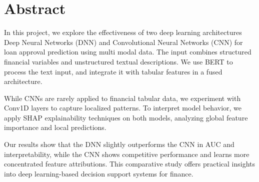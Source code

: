 \section*{Abstract}

In this project, we explore the effectiveness of two deep learning architectures Deep Neural Networks (DNN) and Convolutional Neural Networks (CNN) for loan approval prediction using multi modal data. The input combines structured financial variables and unstructured textual descriptions. We use BERT to process the text input, and integrate it with tabular features in a fused architecture.

While CNNs are rarely applied to financial tabular data, we experiment with Conv1D layers to capture localized patterns. To interpret model behavior, we apply SHAP explainability techniques on both models, analyzing global feature importance and local predictions.

Our results show that the DNN slightly outperforms the CNN in AUC and interpretability, while the CNN shows competitive performance and learns more concentrated feature attributions. This comparative study offers practical insights into deep learning-based decision support systems for finance.